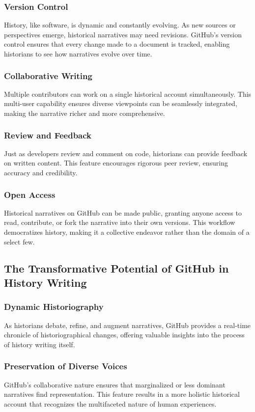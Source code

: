 \documentclass{book}
\begin{document}
\subsubsection*{Version Control}
History, like software, is dynamic and constantly evolving. As new sources or perspectives emerge, historical narratives may need revisions. GitHub's version control ensures that every change made to a document is tracked, enabling historians to see how narratives evolve over time.

\subsubsection*{Collaborative Writing}
Multiple contributors can work on a single historical account simultaneously. This multi-user capability ensures diverse viewpoints can be seamlessly integrated, making the narrative richer and more comprehensive.

\subsubsection*{Review and Feedback}
Just as developers review and comment on code, historians can provide feedback on written content. This feature encourages rigorous peer review, ensuring accuracy and credibility.

\subsubsection*{Open Access}
Historical narratives on GitHub can be made public, granting anyone access to read, contribute, or fork the narrative into their own versions. This workflow democratizes history, making it a collective endeavor rather than the domain of a select few.

\subsection*{The Transformative Potential of GitHub in History Writing}
\subsubsection*{Dynamic Historiography}
As historians debate, refine, and augment narratives, GitHub provides a real-time chronicle of historiographical changes, offering valuable insights into the process of history writing itself.

\subsubsection*{Preservation of Diverse Voices}
GitHub's collaborative nature ensures that marginalized or less dominant narratives find representation. This feature results in a more holistic historical account that recognizes the multifaceted nature of human experiences.
\end{document}
